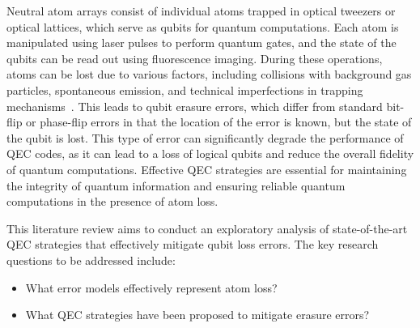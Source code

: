 \documentclass[aps,prb,twocolumn,superscriptaddress,nobibnotes]{revtex4-2} %
\begin{document}
Neutral atom arrays consist of individual atoms trapped in optical tweezers or optical lattices, which serve as qubits for quantum computations.
Each atom is manipulated using laser pulses to perform quantum gates, and the state of the qubits can be read out using fluorescence imaging.
During these operations, atoms can be lost due to various factors, including collisions with background gas particles, spontaneous emission, and technical imperfections in trapping mechanisms~\cite{Bluvstein2024}.
This leads to qubit erasure errors, which differ from standard bit-flip or phase-flip errors in that the location of the error is known, but the state of the qubit is lost.
This type of error can significantly degrade the performance of QEC codes, as it can lead to a loss of logical qubits and reduce the overall fidelity of quantum computations.
Effective QEC strategies are essential for maintaining the integrity of quantum information and ensuring reliable quantum computations in the presence of atom loss.

\vspace{8pt}
This literature review aims to conduct an exploratory analysis of state-of-the-art QEC strategies that effectively mitigate qubit loss errors. 
The key research questions to be addressed include:
\begin{itemize}
    \item What error models effectively represent atom loss?
    \item What QEC strategies have been proposed to mitigate erasure errors?
\end{itemize}
\end{document}
